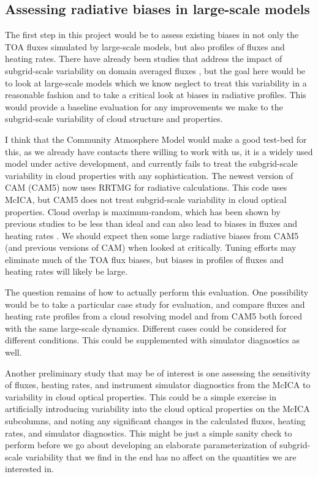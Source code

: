 \documentclass{article}
\begin{document}
\subsection{Assessing radiative biases in large-scale models}
\label{benchmark}
The first step in this project would be to assess existing biases in not only the TOA fluxes simulated by large-scale models, but also profiles of fluxes and heating rates. There have already been studies that address the impact of subgrid-scale variability on domain averaged fluxes \citep[e.g.][]{barker_et_al_1999}, but the goal here would be to look at large-scale models which we know neglect to treat this variability in a reasonable fashion and to take a critical look at biases in radiative profiles. This would provide a baseline evaluation for any improvements we make to the subgrid-scale variability of cloud structure and properties.

I think that the Community Atmosphere Model would make a good test-bed for this, as we already have contacts there willing to work with us, it is a widely used model under active development, and currently fails to treat the subgrid-scale variability in cloud properties with any sophistication. The newest version of CAM (CAM5) now uses RRTMG for radiative calculations. This code uses McICA, but CAM5 does not treat subgrid-scale variability in cloud optical properties. Cloud overlap is maximum-random, which has been shown by previous studies to be less than ideal and can also lead to biases in fluxes and heating rates \citep[e.g.][]{barker_et_al_1999}. We should expect then some large radiative biases from CAM5 (and previous versions of CAM) when looked at critically. Tuning efforts may eliminate much of the TOA flux biases, but biases in profiles of fluxes and heating rates will likely be large.

The question remains of how to actually perform this evaluation. One possibility would be to take a particular case study for evaluation, and compare fluxes and heating rate profiles from a cloud resolving model and from CAM5 both forced with the same large-scale dynamics. Different cases could be considered for different conditions. This could be supplemented with simulator diagnostics as well.

Another preliminary study that may be of interest is one assessing the sensitivity of fluxes, heating rates, and instrument simulator diagnostics from the McICA to variability in cloud optical properties. This could be a simple exercise in artificially introducing variability into the cloud optical properties on the McICA subcolumns, and noting any significant changes in the calculated fluxes, heating rates, and simulator diagnostics. This might be just a simple sanity check to perform before we go about developing an elaborate parameterization of subgrid-scale variability that we find in the end has no affect on the quantities we are interested in.
\end{document}
